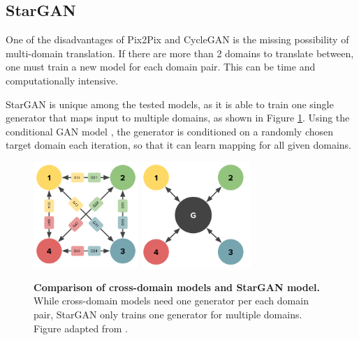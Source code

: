 \documentclass[12pt]{report}
\begin{document}
\pagebreak
\subsection{StarGAN}

One of the disadvantages of Pix2Pix and CycleGAN is the missing possibility of multi-domain translation. If there are more than 2 domains to translate between, one must train a new model for each domain pair. This can be time and computationally intensive.

StarGAN \cite{choi_stargan_2017} is unique among the tested models, as it is able to train one single generator that maps input to multiple domains, as shown in Figure \ref{fig:stargan_topo}. Using the conditional GAN model \cite{mirza_conditional_2014}, the generator is conditioned on a randomly chosen target domain each iteration, so that it can learn mapping for all given domains. %

\begin{figure}[h]
\centering
{}
{\includegraphics[height=4cm]{03_analysis/gans/StarGAN_graph}}\hspace{1cm}
{\includegraphics[height=4cm]{03_analysis/gans/StarGAN_graph2}}
\caption{\label{fig:stargan_topo} \textbf{Comparison of cross-domain models and StarGAN model.} While cross-domain models need one generator per each domain pair, StarGAN only trains one generator for multiple domains. Figure adapted from \cite{choi_stargan_2017}.}
\end{figure}
\end{document}
